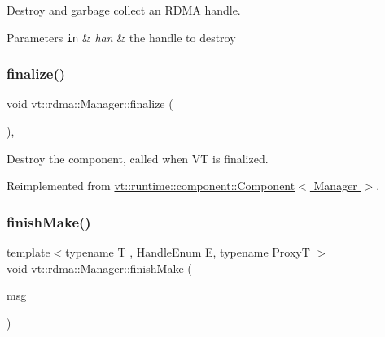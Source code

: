Destroy and garbage collect an R\+D\+MA handle. 


\begin{DoxyParams}[1]{Parameters}
\mbox{\tt in}  & {\em han} & the handle to destroy \\
\hline
\end{DoxyParams}
\mbox{\label{structvt_1_1rdma_1_1_manager_ad4ff20cf1ba6e870326b20900e6eb581}} 
\subsubsection{\texorpdfstring{finalize()}{finalize()}}
{\footnotesize\ttfamily void vt\+::rdma\+::\+Manager\+::finalize (\begin{DoxyParamCaption}{ }\end{DoxyParamCaption})\hspace{0.3cm}{\ttfamily [override]}, {\ttfamily [virtual]}}



Destroy the component, called when VT is finalized. 



Reimplemented from \hyperlink{structvt_1_1runtime_1_1component_1_1_component_a098e362de01af6054e5491fba671a959}{vt\+::runtime\+::component\+::\+Component$<$ Manager $>$}.

\mbox{\label{structvt_1_1rdma_1_1_manager_a462f2059efb91643275a921c84f72f67}} 
\subsubsection{\texorpdfstring{finish\+Make()}{finishMake()}}
{\footnotesize\ttfamily template$<$typename T , Handle\+Enum E, typename ProxyT $>$ \\
void vt\+::rdma\+::\+Manager\+::finish\+Make (\begin{DoxyParamCaption}\item[{\hyperlink{structvt_1_1rdma_1_1impl_1_1_construct_msg}{impl\+::\+Construct\+Msg}$<$ T, E, ProxyT $>$ $\ast$}]{msg }\end{DoxyParamCaption})\hspace{0.3cm}{\ttfamily [private]}}



